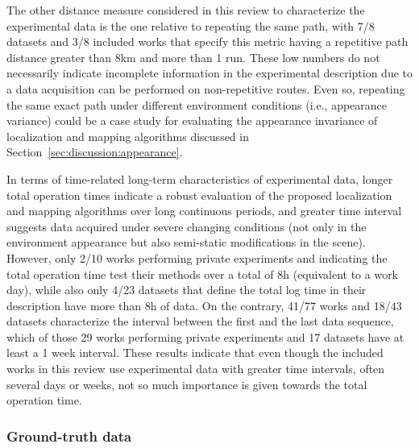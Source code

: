 The other distance measure considered in this review to characterize the experimental data is the one relative to repeating the same path, with 7/8 datasets and 3/8 included works that specify this metric having a repetitive path distance greater than 8km and more than 1 run. These low numbers do not necessarily indicate incomplete information in the experimental description due to a data acquisition can be performed on non-repetitive routes. Even so, repeating the same exact path under different environment conditions (i.e., appearance variance) could be a case study for evaluating the appearance invariance of localization and mapping algorithms discussed in Section~\ref{sec:discussion:appearance}.

In terms of time-related long-term characteristics of experimental data, longer total operation times indicate a robust evaluation of the proposed localization and mapping algorithms over long continuous periods, and greater time interval suggests data acquired under severe changing conditions (not only in the environment appearance but also semi-static modifications in the scene). However, only 2/10 works performing private experiments and indicating the total operation time test their methods over a total of 8h (equivalent to a work day), while also only 4/23 datasets that define the total log time in their description have more than 8h of data. On the contrary, 41/77 works and 18/43 datasets characterize the interval between the first and the last data sequence, which of those 29 works performing private experiments and 17 datasets have at least a 1 week interval. These results indicate that even though the included works in this review use experimental data with greater time intervals, often several days or weeks, not so much importance is given towards the total operation time.



\subsubsection{Ground-truth data}

